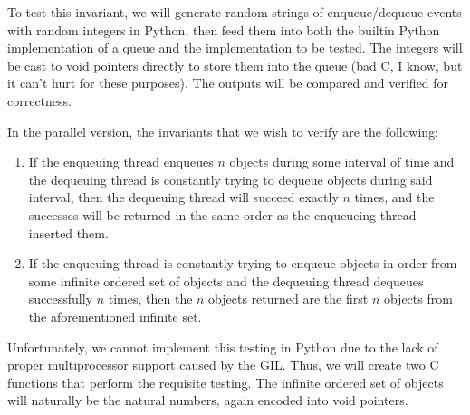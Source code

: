 \documentclass{article}
\begin{document}
To test this invariant, we will generate random strings of enqueue/dequeue events with random integers in Python, then feed them into both the builtin Python implementation of a queue and the implementation to be tested. The integers will be cast to void pointers directly to store them into the queue (bad C, I know, but it can't hurt for these purposes). The outputs will be compared and verified for correctness.

In the parallel version, the invariants that we wish to verify are the following:
\begin{enumerate}
    \item If the enqueuing thread enqueues $n$ objects during some interval of time and the dequeuing thread is constantly trying to dequeue objects during said interval, then the dequeuing thread will succeed exactly $n$ times, and the successes will be returned in the same order as the enqueueing thread inserted them.
    \item If the enqueuing thread is constantly trying to enqueue objects in order from some infinite ordered set of objects and the dequeuing thread dequeues successfully $n$ times, then the $n$ objects returned are the first $n$ objects from the aforementioned infinite set.
\end{enumerate}
Unfortunately, we cannot implement this testing in Python due to the lack of proper multiprocessor support caused by the GIL. Thus, we will create two C functions that perform the requisite testing. The infinite ordered set of objects will naturally be the natural numbers, again encoded into void pointers. 
\end{document}
